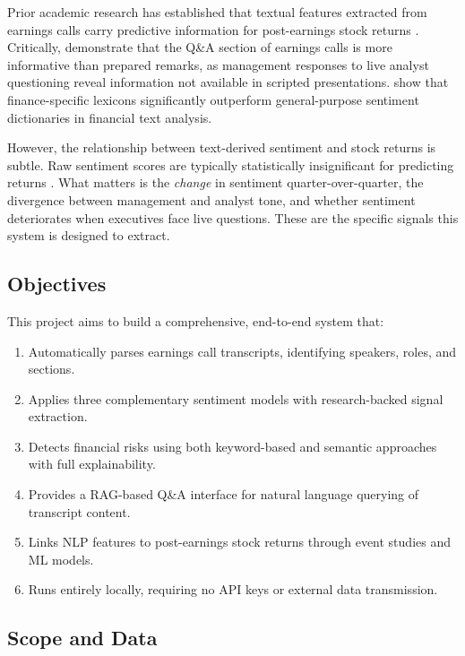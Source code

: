 \documentclass[12pt,a4paper]{article}
\begin{document}
Prior academic research has established that textual features extracted from earnings calls carry predictive information for post-earnings stock returns \citep{loughran2011liability, price2012earnings, chen2018sentimental}. Critically, \citet{price2012earnings} demonstrate that the Q\&A section of earnings calls is more informative than prepared remarks, as management responses to live analyst questioning reveal information not available in scripted presentations. \citet{loughran2011liability} show that finance-specific lexicons significantly outperform general-purpose sentiment dictionaries in financial text analysis.

However, the relationship between text-derived sentiment and stock returns is subtle. Raw sentiment scores are typically statistically insignificant for predicting returns \citep{chen2018sentimental}. What matters is the \emph{change} in sentiment quarter-over-quarter, the divergence between management and analyst tone, and whether sentiment deteriorates when executives face live questions. These are the specific signals this system is designed to extract.

\subsection{Objectives}

This project aims to build a comprehensive, end-to-end system that:
\begin{enumerate}[noitemsep]
    \item Automatically parses earnings call transcripts, identifying speakers, roles, and sections.
    \item Applies three complementary sentiment models with research-backed signal extraction.
    \item Detects financial risks using both keyword-based and semantic approaches with full explainability.
    \item Provides a RAG-based Q\&A interface for natural language querying of transcript content.
    \item Links NLP features to post-earnings stock returns through event studies and ML models.
    \item Runs entirely locally, requiring no API keys or external data transmission.
\end{enumerate}

\subsection{Scope and Data}
\end{document}
